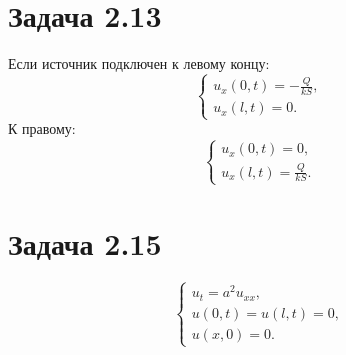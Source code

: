\documentclass[11pt]{article}
\begin{document}
\section{Задача 2.13}
\label{sec:orgebf0dba}
Если источник подключен к левому концу:
\begin{equation}
\begin{cases}
u_x(0, t) = -\frac{Q}{kS}, \\
u_x(l, t) = 0.
\end{cases}
\end{equation}
К правому:
\begin{equation}
\begin{cases}
u_x(0, t) = 0, \\
u_x(l, t) = \frac{Q}{kS}.
\end{cases}
\end{equation}
\section{Задача 2.15}
\label{sec:org58ae717}
\begin{equation}
\begin{cases}
u_t = a^2u_{xx}, \\
u(0, t) = u(l, t) = 0, \\
u(x, 0) = 0.
\end{cases}
\end{equation}
\end{document}
